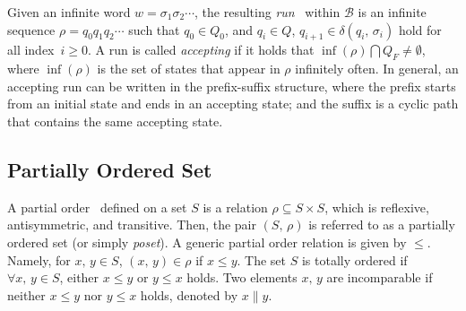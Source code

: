 Given an infinite word $w=\sigma_1\sigma_2\cdots$, the resulting \emph{run}~\cite{baier2008principles} within $\mathcal{B}$
is an infinite sequence $\rho=q_0q_1q_2\cdots$
such that $q_0\in Q_0$, and $q_i\in Q$, $q_{i+1}\in\delta(q_i,\,\sigma_i)$ hold for all index~$i\geq 0$.
A run is called \emph{accepting} if it holds that
$\inf(\rho)\bigcap {Q}_F \neq \emptyset$,
where $\inf(\rho)$ is the set of states that appear in $\rho$ infinitely often.
In general, an accepting run can be written in the prefix-suffix structure,
where the prefix starts from an initial state and ends in an accepting state;
and the suffix is a cyclic path that contains the same accepting state.
 
\subsection{Partially Ordered Set}\label{subsec:partial}
A partial order~\cite{simovici2008mathematical} defined on a set $S$ is a relation $\rho\subseteq S\times S$,
which is reflexive, antisymmetric, and transitive.
Then, the pair $(S,\, \rho)$ is referred to as a partially ordered set (or simply \emph{poset}).
A generic partial order relation is given by $\leq$.
Namely, for $x,\,y\in S$, $(x,\,y)\in \rho$ if $x\leq y$.
The set $S$ is totally ordered if $\forall x,\,y\in S$, either $x\leq y$ or $y\leq x$ holds.
Two elements $x,\,y$ are incomparable if neither $x\leq y$ nor $y\leq x$ holds, denoted by $x\parallel y$.
